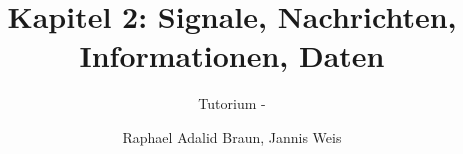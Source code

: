 \documentclass[18pt]{beamer}
\title[Signale, Nachrichten...]{Kapitel 2: Signale, Nachrichten, Informationen, Daten}
\subtitle{Tutorium - } %
\author{Raphael Adalid Braun, Jannis Weis}
\institute{Grundbegriffe der Informatik | WS 2018/19}
\begin{document}

\begin{frame}
 \titlepage
\end{frame}

\def\showSolutions{1}					 %

\title[Signale]{}

\end{document}
